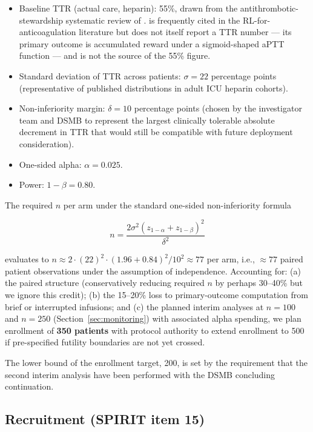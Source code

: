 \documentclass[11pt]{article}
\begin{document}
\begin{itemize}
  \item Baseline TTR (actual care, heparin): 55\%, drawn from the antithrombotic-stewardship systematic review of \citet{wan2008}. \citet{nemati2016} is frequently cited in the RL-for-anticoagulation literature but does not itself report a TTR number --- its primary outcome is accumulated reward under a sigmoid-shaped aPTT function --- and is not the source of the 55\% figure.
  \item Standard deviation of TTR across patients: $\sigma = 22$ percentage points (representative of published distributions in adult ICU heparin cohorts).
  \item Non-inferiority margin: $\delta = 10$ percentage points (chosen by the investigator team and DSMB to represent the largest clinically tolerable absolute decrement in TTR that would still be compatible with future deployment consideration).
  \item One-sided alpha: $\alpha = 0.025$.
  \item Power: $1 - \beta = 0.80$.
\end{itemize}

The required $n$ per arm under the standard one-sided non-inferiority formula

\begin{equation}
  n = \frac{2 \sigma^2 (z_{1-\alpha} + z_{1-\beta})^2}{\delta^2}
\end{equation}

evaluates to $n \approx 2 \cdot (22)^2 \cdot (1.96 + 0.84)^2 / 10^2 \approx 77$ per arm, i.e., $\approx 77$ paired patient observations under the assumption of independence. Accounting for: (a) the paired structure (conservatively reducing required $n$ by perhaps 30--40\% but we ignore this credit); (b) the 15--20\% loss to primary-outcome computation from brief or interrupted infusions; and (c) the planned interim analyses at $n=100$ and $n=250$ (Section~\ref{sec:monitoring}) with associated alpha spending, we plan enrollment of \textbf{350 patients} with protocol authority to extend enrollment to 500 if pre-specified futility boundaries are not yet crossed.

The lower bound of the enrollment target, 200, is set by the requirement that the second interim analysis have been performed with the DSMB concluding continuation.

\subsection{Recruitment (SPIRIT item 15)}
\end{document}
